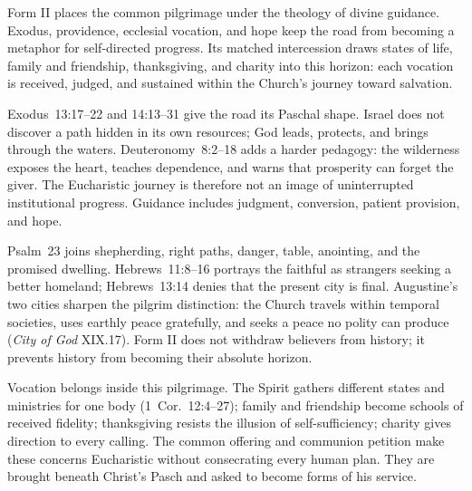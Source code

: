 
Form II places the common pilgrimage under the theology of divine guidance. Exodus, providence, ecclesial vocation, and hope keep the road from becoming a metaphor for self-directed progress. Its matched intercession draws states of life, family and friendship, thanksgiving, and charity into this horizon: each vocation is received, judged, and sustained within the Church's journey toward salvation.

Exodus~13:17--22 and 14:13--31 give the road its Paschal shape. Israel does not discover a path hidden in its own resources; God leads, protects, and brings through the waters. Deuteronomy~8:2--18 adds a harder pedagogy: the wilderness exposes the heart, teaches dependence, and warns that prosperity can forget the giver. The Eucharistic journey is therefore not an image of uninterrupted institutional progress. Guidance includes judgment, conversion, patient provision, and hope.

Psalm~23 joins shepherding, right paths, danger, table, anointing, and the promised dwelling. Hebrews~11:8--16 portrays the faithful as strangers seeking a better homeland; Hebrews~13:14 denies that the present city is final. Augustine's two cities sharpen the pilgrim distinction: the Church travels within temporal societies, uses earthly peace gratefully, and seeks a peace no polity can produce (\emph{City of God} XIX.17). Form II does not withdraw believers from history; it prevents history from becoming their absolute horizon.

Vocation belongs inside this pilgrimage. The Spirit gathers different states and ministries for one body (1~Cor.~12:4--27); family and friendship become schools of received fidelity; thanksgiving resists the illusion of self-sufficiency; charity gives direction to every calling. The common offering and communion petition make these concerns Eucharistic without consecrating every human plan. They are brought beneath Christ's Pasch and asked to become forms of his service.



